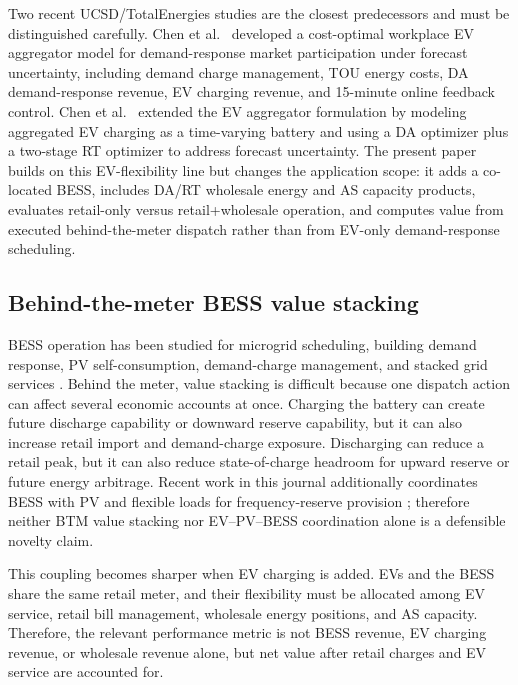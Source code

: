 \documentclass[final,5p,times]{elsarticle}
\begin{document}
Two recent UCSD/TotalEnergies studies are the closest predecessors and must be distinguished carefully. Chen et al.~\cite{chen2024costoptimal} developed a cost-optimal workplace EV aggregator model for demand-response market participation under forecast uncertainty, including demand charge management, TOU energy costs, DA demand-response revenue, EV charging revenue, and 15-minute online feedback control. Chen et al.~\cite{chen2026realtime} extended the EV aggregator formulation by modeling aggregated EV charging as a time-varying battery and using a DA optimizer plus a two-stage RT optimizer to address forecast uncertainty. The present paper builds on this EV-flexibility line but changes the application scope: it adds a co-located BESS, includes DA/RT wholesale energy and AS capacity products, evaluates retail-only versus retail+wholesale operation, and computes value from executed behind-the-meter dispatch rather than from EV-only demand-response scheduling.

\subsection{Behind-the-meter BESS value stacking}
BESS operation has been studied for microgrid scheduling, building demand response, PV self-consumption, demand-charge management, and stacked grid services \cite{parisio2014model,raoufat2018bess,chen2021valueStacking,idomar2026stacked}. Behind the meter, value stacking is difficult because one dispatch action can affect several economic accounts at once. Charging the battery can create future discharge capability or downward reserve capability, but it can also increase retail import and demand-charge exposure. Discharging can reduce a retail peak, but it can also reduce state-of-charge headroom for upward reserve or future energy arbitrage. Recent work in this journal additionally coordinates BESS with PV and flexible loads for frequency-reserve provision \cite{damianakis2026integration}; therefore neither BTM value stacking nor EV--PV--BESS coordination alone is a defensible novelty claim.

This coupling becomes sharper when EV charging is added. EVs and the BESS share the same retail meter, and their flexibility must be allocated among EV service, retail bill management, wholesale energy positions, and AS capacity. Therefore, the relevant performance metric is not BESS revenue, EV charging revenue, or wholesale revenue alone, but net value after retail charges and EV service are accounted for.
\end{document}
